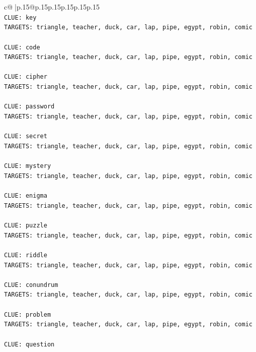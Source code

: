 \documentclass{article}
\begin{document}
{\begin{supertabular}{c@{$\;$}|p{.15\linewidth}@{}p{.15\linewidth}p{.15\linewidth}p{.15\linewidth}p{.15\linewidth}p{.15\linewidth}}
{{{\\ 
\texttt{CLUE: key} \\
\texttt{TARGETS: triangle, teacher, duck, car, lap, pipe, egypt, robin, comic} \\
\\ 
\texttt{CLUE: code} \\
\texttt{TARGETS: triangle, teacher, duck, car, lap, pipe, egypt, robin, comic} \\
\\ 
\texttt{CLUE: cipher} \\
\texttt{TARGETS: triangle, teacher, duck, car, lap, pipe, egypt, robin, comic} \\
\\ 
\texttt{CLUE: password} \\
\texttt{TARGETS: triangle, teacher, duck, car, lap, pipe, egypt, robin, comic} \\
\\ 
\texttt{CLUE: secret} \\
\texttt{TARGETS: triangle, teacher, duck, car, lap, pipe, egypt, robin, comic} \\
\\ 
\texttt{CLUE: mystery} \\
\texttt{TARGETS: triangle, teacher, duck, car, lap, pipe, egypt, robin, comic} \\
\\ 
\texttt{CLUE: enigma} \\
\texttt{TARGETS: triangle, teacher, duck, car, lap, pipe, egypt, robin, comic} \\
\\ 
\texttt{CLUE: puzzle} \\
\texttt{TARGETS: triangle, teacher, duck, car, lap, pipe, egypt, robin, comic} \\
\\ 
\texttt{CLUE: riddle} \\
\texttt{TARGETS: triangle, teacher, duck, car, lap, pipe, egypt, robin, comic} \\
\\ 
\texttt{CLUE: conundrum} \\
\texttt{TARGETS: triangle, teacher, duck, car, lap, pipe, egypt, robin, comic} \\
\\ 
\texttt{CLUE: problem} \\
\texttt{TARGETS: triangle, teacher, duck, car, lap, pipe, egypt, robin, comic} \\
\\ 
\texttt{CLUE: question} \\
}}}
\end{supertabular}}
\end{document}
